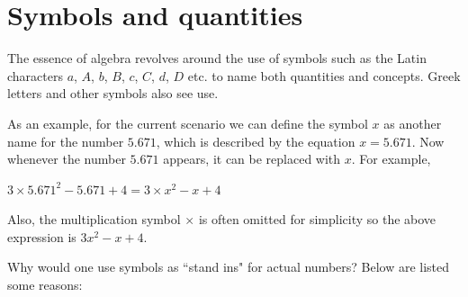 \documentclass{article}
\begin{document}
\section{Symbols and quantities}

The essence of algebra revolves around the use of symbols such as the Latin characters \(a\), \(A\), \(b\), \(B\), \(c\), \(C\), \(d\), \(D\) etc. to name both quantities and concepts. Greek letters and other symbols also see use.

As an example, for the current scenario we can define the symbol \(x\) as another name for the number \(5.671\), which is described by the equation \(x = 5.671\). Now whenever the number \(5.671\) appears, it can be replaced with \(x\). For example, 

\(3 \times 5.671^2 - 5.671 + 4 = 3 \times x^2 - x + 4\) 

Also, the multiplication symbol \(\times\) is often omitted for simplicity so the above expression is \(3x^2 - x + 4\).  

Why would one use symbols as ``stand ins" for actual numbers? Below are listed some reasons:
\end{document}
